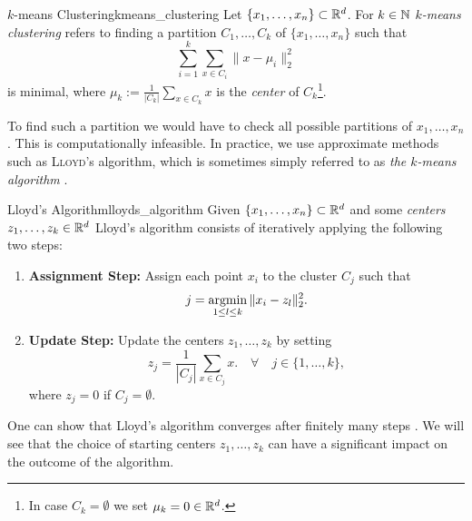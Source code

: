 \begin{definition}{$k$-means Clustering}{kmeans_clustering}
Let $\{x_1, \dots, x_n\} \subset \mathbb R^d$. For $k \in \mathbb N$ \emph{$k$-means clustering} refers to finding a partition $C_1, \dots, C_k$ of $\{x_1, \dots, x_n\}$ such that
\begin{equation*}
\label{eq:kmean_optimization}
    \sum_{i = 1}^k \sum_{x \in C_i} \|x - \mu_i\|^2_2
\end{equation*}
is minimal, where $\mu_k := \frac{1}{|C_k|}\sum_{x \in C_k} x$ is the \emph{center} of $C_k$\footnote{In case $C_k = \emptyset$ we set $\mu_k = 0 \in \mathbb R^d$.}.
\end{definition}
To find such a partition we would have to check all possible partitions of $x_1, \dots, x_n$. This is computationally infeasible. In practice, we use approximate methods such as \textsc{Lloyd}'s algorithm, which is sometimes simply referred to as \emph{the $k$-means algorithm} \cite[Sec.~3.1.2]{Scitovski2021}.

\begin{definition}{Lloyd's Algorithm}{lloyds_algorithm}
Given $\{x_1, \dots, x_n\} \subset \mathbb R^d$ and some \emph{centers} $z_1, \dots, z_k \in \mathbb R^d$
Lloyd's algorithm consists of iteratively applying the following two steps:

\begin{enumerate}
    \item \textbf{Assignment Step:} Assign each point $x_i$ to the cluster $C_j$ such that
    $$
    j = \operatorname*{argmin}_{1 \leq l \leq k} \|x_i - z_l\|^2_2.
    $$

    \item \textbf{Update Step:} Update the centers $z_1, \dots, z_k$ by setting
    $$
    z_j = \frac{1}{|C_j|}\sum_{x \in C_j} x. \quad \forall \quad j \in \{1, \dots, k\},
    $$
    where $z_j = 0$ if $C_j = \emptyset$. 
\end{enumerate}
\end{definition}

One can show that Lloyd's algorithm converges after finitely many steps \cite[Thm.~3.14]{Scitovski2021}.
We will see that the choice of starting centers $z_1, \dots, z_k$ can have a significant impact on the outcome of the algorithm.


